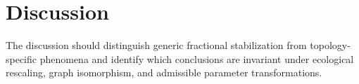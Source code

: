\section{Discussion}
The discussion should distinguish generic fractional stabilization from topology-specific phenomena and identify which conclusions are invariant under ecological rescaling, graph isomorphism, and admissible parameter transformations.
